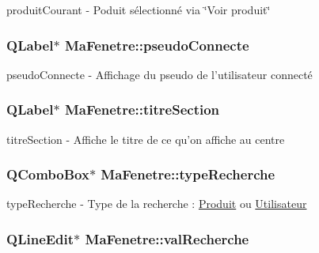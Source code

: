produit\-Courant -\/ Poduit sélectionné via \char`\"{}\-Voir produit\char`\"{} 

\hypertarget{class_ma_fenetre_ae7932944c172401e793af721335e7c3d}{
\subsubsection[{pseudo\-Connecte}]{\setlength{\rightskip}{0pt plus 5cm}Q\-Label$\ast$ Ma\-Fenetre\-::pseudo\-Connecte\hspace{0.3cm}{\ttfamily [protected]}}}\label{class_ma_fenetre_ae7932944c172401e793af721335e7c3d}


pseudo\-Connecte -\/ Affichage du pseudo de l'utilisateur connecté 

\hypertarget{class_ma_fenetre_ac4749f9608f7c8d6e5d60434ddbedfc5}{
\subsubsection[{titre\-Section}]{\setlength{\rightskip}{0pt plus 5cm}Q\-Label$\ast$ Ma\-Fenetre\-::titre\-Section\hspace{0.3cm}{\ttfamily [protected]}}}\label{class_ma_fenetre_ac4749f9608f7c8d6e5d60434ddbedfc5}


titre\-Section -\/ Affiche le titre de ce qu'on affiche au centre 

\hypertarget{class_ma_fenetre_a3df6a320b8835369da88bf94b701ae76}{
\subsubsection[{type\-Recherche}]{\setlength{\rightskip}{0pt plus 5cm}Q\-Combo\-Box$\ast$ Ma\-Fenetre\-::type\-Recherche\hspace{0.3cm}{\ttfamily [protected]}}}\label{class_ma_fenetre_a3df6a320b8835369da88bf94b701ae76}


type\-Recherche -\/ Type de la recherche \-: \hyperlink{class_produit}{Produit} ou \hyperlink{class_utilisateur}{Utilisateur} 

\hypertarget{class_ma_fenetre_a37836681a6d48a32dcd379b11447f579}{
\subsubsection[{val\-Recherche}]{\setlength{\rightskip}{0pt plus 5cm}Q\-Line\-Edit$\ast$ Ma\-Fenetre\-::val\-Recherche\hspace{0.3cm}{\ttfamily [protected]}}}\label{class_ma_fenetre_a37836681a6d48a32dcd379b11447f579}


